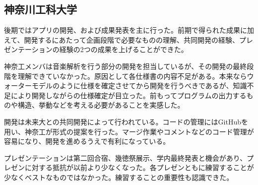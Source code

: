 \subsection{神奈川工科大学}
\par
後期ではアプリの開発、および成果発表を主に行った。前期で得られた成果に加えて、開発するにあたって企画段階で必要なものの理解、共同開発の経験、プレゼンテーションの経験の2つの成果を上げることができた。
\par
神奈工メンバは音楽解析を行う部分の開発を担当しているが、その開発の最終段階を理解できていなかった。原因として各仕様書の内容不足がある。本来ならウォーターモデルのように仕様を確定させてから開発を行うべきであるが、知識不足により開発しながらの仕様確定が目立った。前もってプログラムの出力するものや構造、挙動などを考える必要があることを実感した。
\par
開発は未来大との共同開発によって行われている。コードの管理にはGitHubを用い、神奈工が形式の提案を行った。マージ作業やコメントなどのコード管理が容易になり、開発を進めるうえで有利になっている。
\par
プレゼンテーションは第二回合宿、幾徳祭展示、学内最終発表と機会があり、プレゼンに対する抵抗が以前より少なくなった。各プレゼンともに練習することが少なくベストなものではなかった。練習することの重要性も認識できた。
